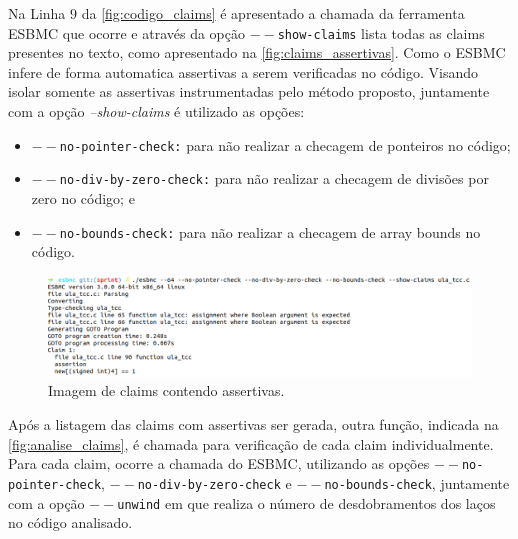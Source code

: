 \par
Na Linha $9$ da \autoref{fig:codigo_claims} é apresentado a chamada da ferramenta ESBMC que ocorre e através da opção \texttt{$--$show-claims} lista todas as claims presentes no texto, como apresentado na \autoref{fig:claims_assertivas}. Como o ESBMC infere de forma automatica assertivas a serem verificadas no código. Visando isolar somente as assertivas instrumentadas pelo método proposto, juntamente com a opção \textit{--show-claims} é utilizado as opções:
\begin{itemize}
    \item \texttt{$--$no-pointer-check:} para não realizar a checagem de ponteiros no código;
    \item \texttt{$--$no-div-by-zero-check:} para não realizar a checagem de divisões por zero no código; e
    \item \texttt{$--$no-bounds-check:} para não realizar a checagem de array bounds no código.
\end{itemize}

\begin{figure}[H]
	\begin{center}
    \caption{\label{fig:claims_assertivas}Imagem de claims contendo assertivas.}
	\includegraphics[scale=0.55 ]{Figuras/lista_claim.png}
	\end{center}
\end{figure}

\par
Após a listagem das claims com assertivas ser gerada, outra função, indicada na \autoref{fig:analise_claims}, é chamada para verificação de cada claim individualmente. Para cada claim, ocorre a chamada do ESBMC, utilizando as opções \texttt{$--$no-pointer-check}, \texttt{$--$no-div-by-zero-check} e \texttt{$--$no-bounds-check}, juntamente com a opção \texttt{$--$unwind} em que realiza o número de desdobramentos dos laços no código analisado. 

